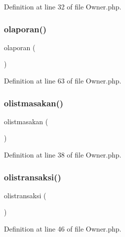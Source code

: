 Definition at line 32 of file Owner.\+php.

\mbox{\label{class_owner_a948c907807d4481b648fc7aefb6359ab}} 
\subsubsection{\texorpdfstring{olaporan()}{olaporan()}}
{\footnotesize\ttfamily olaporan (\begin{DoxyParamCaption}{ }\end{DoxyParamCaption})}



Definition at line 63 of file Owner.\+php.

\mbox{\label{class_owner_a1a9a10ef9f361c0f8f2329e6bc2b566e}} 
\subsubsection{\texorpdfstring{olistmasakan()}{olistmasakan()}}
{\footnotesize\ttfamily olistmasakan (\begin{DoxyParamCaption}{ }\end{DoxyParamCaption})}



Definition at line 38 of file Owner.\+php.

\mbox{\label{class_owner_ab6f6db261d765679a6a5acf5024324f5}} 
\subsubsection{\texorpdfstring{olistransaksi()}{olistransaksi()}}
{\footnotesize\ttfamily olistransaksi (\begin{DoxyParamCaption}{ }\end{DoxyParamCaption})}



Definition at line 46 of file Owner.\+php.

\mbox{\label{class_owner_a51b3d019fdb935a5eeb91e911a7abe15}} 
